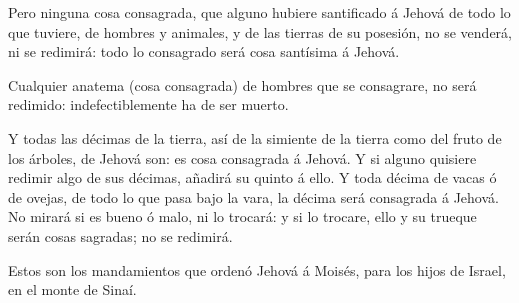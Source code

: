  Pero ninguna cosa consagrada, que alguno hubiere
santificado á Jehová de todo lo que tuviere, de hombres y animales, y de
las tierras de su posesión, no se venderá, ni se redimirá: todo lo
consagrado será cosa santísima á Jehová.

 Cualquier anatema (cosa consagrada) de hombres que se
consagrare, no será redimido: indefectiblemente ha de ser muerto.

 Y todas las décimas de la tierra, así de la simiente de la
tierra como del fruto de los árboles, de Jehová son: es cosa consagrada
á Jehová.  Y si alguno quisiere redimir algo de sus
décimas, añadirá su quinto á ello.  Y toda décima de vacas
ó de ovejas, de todo lo que pasa bajo la vara, la décima será consagrada
á Jehová.  No mirará si es bueno ó malo, ni lo trocará: y
si lo trocare, ello y su trueque serán cosas sagradas; no se redimirá.

 Estos son los mandamientos que ordenó Jehová á Moisés,
para los hijos de Israel, en el monte de Sinaí.
